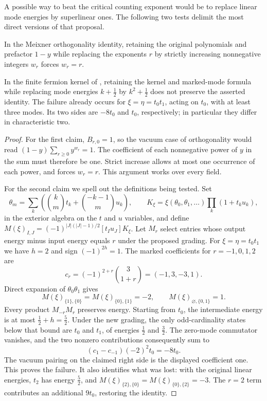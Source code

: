 A possible way to beat the critical counting exponent would be to replace linear mode energies by superlinear ones. The following two tests delimit the most direct versions of that proposal.

\begin{proposition}\label{prop:energy-reweighting}
In the Meixner orthogonality identity, retaining the original polynomials and prefactor $1-y$ while replacing the exponents $r$ by strictly increasing nonnegative integers $w_r$ forces $w_r=r$.

In the finite fermion kernel of \cite[Theorem 2]{Khoruzhii2026}, retaining the kernel and marked-mode formula while replacing mode energies $k+\tfrac12$ by $k^2+\tfrac12$ does not preserve the asserted identity. The failure already occurs for $\xi=\eta=t_0t_1$, acting on $t_0$, with at least three modes. Its two sides are $-8t_0$ and $t_0$, respectively; in particular they differ in characteristic two.
\end{proposition}
\begin{proof}
For the first claim, $B_{r,0}=1$, so the vacuum case of orthogonality would read
$(1-y)\sum_{r\geq0}y^{w_r}=1$. The coefficient of each nonnegative power of $y$ in the sum must therefore be one. Strict increase allows at most one occurrence of each power, and forces $w_r=r$. This argument works over every field.

For the second claim we spell out the definitions being tested. Set
\[
 \theta_m=\sum_k\left(\binom km t_k+\binom{-k-1}m u_k\right),\qquad
 K_\xi=\xi(\theta_0,\theta_1,\ldots)\prod_k(1+t_ku_k),
\]
in the exterior algebra on the $t$ and $u$ variables, and define
$M(\xi)_{I,J}=(-1)^{|J|(|J|-1)/2}[t_Iu_J]K_\xi$.
Let $M_r$ select entries whose output energy minus input energy equals $r$ under the proposed grading. For $\xi=\eta=t_0t_1$ we have $h=2$ and sign $(-1)^{2h}=1$. The marked coefficients for $r=-1,0,1,2$ are
\[
 c_r=(-1)^{2+r}\binom3{1+r}=(-1,3,-3,1).
\]
Direct expansion of $\theta_0\theta_1$ gives
\[
 M(\xi)_{\{1\},\{0\}}=M(\xi)_{\{0\},\{1\}}=-2,
 \qquad M(\xi)_{\varnothing,\{0,1\}}=1.
\]
Every product $M_{-r}M_r$ preserves energy. Starting from $t_0$, the intermediate energy is at most $\tfrac12+h=\tfrac52$. Under the new grading, the only odd-cardinality states below that bound are $t_0$ and $t_1$, of energies $\tfrac12$ and $\tfrac32$. The zero-mode commutator vanishes, and the two nonzero contributions consequently sum to
\[
 (c_1-c_{-1})(-2)^2t_0=-8t_0.
\]
The vacuum pairing on the claimed right side is the displayed coefficient one. This proves the failure. It also identifies what was lost: with the original linear energies, $t_2$ has energy $\tfrac52$, and
$M(\xi)_{\{2\},\{0\}}=M(\xi)_{\{0\},\{2\}}=-3$.
The $r=2$ term contributes an additional $9t_0$, restoring the identity.
\end{proof}

